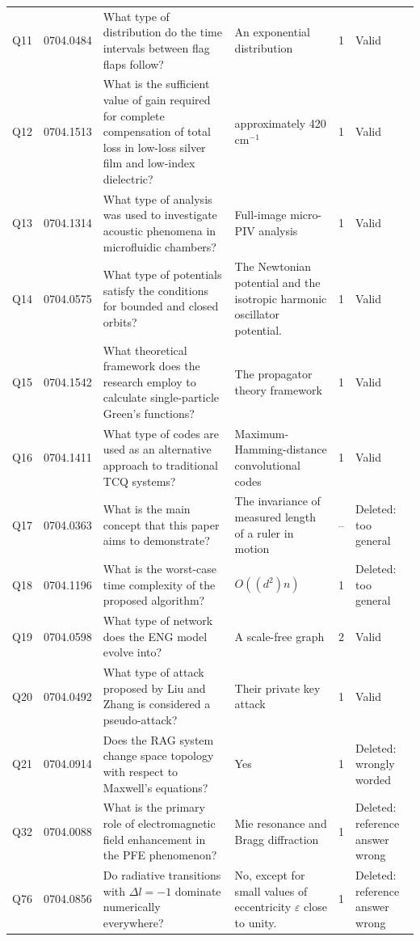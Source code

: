 \documentclass[bdcc,article,submit,pdftex,moreauthors]{Definitions/mdpi}
\begin{document}
\begin{table}[H]
\begin{tabularx}{\textwidth}{@{}p{0.55cm} p{1.25cm} >{\raggedright\arraybackslash}X >{\raggedright\arraybackslash}p{3.3cm} c >{\raggedright\arraybackslash}p{1.9cm}@{}}
\midrule
Q11 & 0704.0484 & What type of distribution do the time intervals between flag flaps follow? & An exponential distribution & 1 & Valid \\
Q12 & 0704.1513 & What is the sufficient value of gain required for complete compensation of total loss in low-loss silver film and low-index dielectric? & approximately 420 cm$^{-1}$ & 1 & Valid \\
Q13 & 0704.1314 & What type of analysis was used to investigate acoustic phenomena in microfluidic chambers? & Full-image micro-PIV analysis & 1 & Valid \\
Q14 & 0704.0575 & What type of potentials satisfy the conditions for bounded and closed orbits? & The Newtonian potential and the isotropic harmonic oscillator potential. & 1 & Valid \\
Q15 & 0704.1542 & What theoretical framework does the research employ to calculate single-particle Green's functions? & The propagator theory framework & 1 & Valid \\
\midrule
Q16 & 0704.1411 & What type of codes are used as an alternative approach to traditional TCQ systems? & Maximum-Hamming-distance convolutional codes & 1 & Valid \\
Q17 & 0704.0363 & What is the main concept that this paper aims to demonstrate? & The invariance of measured length of a ruler in motion & -- & Deleted: too general \\
Q18 & 0704.1196 & What is the worst-case time complexity of the proposed algorithm? & $O((d^2)n)$ & 1 & Deleted: too general \\
Q19 & 0704.0598 & What type of network does the ENG model evolve into? & A scale-free graph & 2 & Valid \\
Q20 & 0704.0492 & What type of attack proposed by Liu and Zhang is considered a pseudo-attack? & Their private key attack & 1 & Valid \\
\midrule
Q21 & 0704.0914 & Does the RAG system change space topology with respect to Maxwell's equations? & Yes & 1 & Deleted: wrongly worded \\
Q32 & 0704.0088 & What is the primary role of electromagnetic field enhancement in the PFE phenomenon? & Mie resonance and Bragg diffraction & 1 & Deleted: reference answer wrong \\
Q76 & 0704.0856 & Do radiative transitions with $\Delta l = -1$ dominate numerically everywhere? & No, except for small values of eccentricity $\varepsilon$ close to unity. & 1 & Deleted: reference answer wrong \\
\bottomrule
\end{tabularx}
\end{table}
\end{document}
